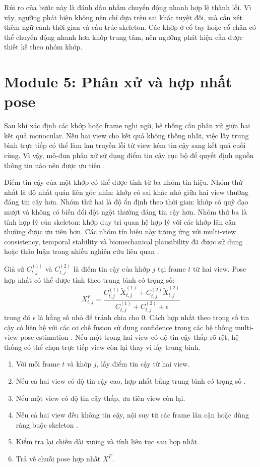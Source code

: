 \documentclass[../DoAn.tex]{subfiles}
\begin{document}
Rủi ro của bước này là đánh dấu nhầm chuyển động nhanh hợp lệ thành lỗi. Vì vậy, ngưỡng phát hiện không nên chỉ dựa trên sai khác tuyệt đối, mà cần xét thêm ngữ cảnh thời gian và cấu trúc skeleton. Các khớp ở cổ tay hoặc cổ chân có thể chuyển động nhanh hơn khớp trung tâm, nên ngưỡng phát hiện cần được thiết kế theo nhóm khớp.

\section{Module 5: Phân xử và hợp nhất pose}
\label{sec:judgment_fusion}

Sau khi xác định các khớp hoặc frame nghi ngờ, hệ thống cần phân xử giữa hai kết quả monocular. Nếu hai view cho kết quả không thống nhất, việc lấy trung bình trực tiếp có thể làm lan truyền lỗi từ view kém tin cậy sang kết quả cuối cùng. Vì vậy, mô-đun phân xử sử dụng điểm tin cậy cục bộ để quyết định nguồn thông tin nào nên được ưu tiên \cite{vu2026multiperspective}.

Điểm tin cậy của một khớp có thể được tính từ ba nhóm tín hiệu. Nhóm thứ nhất là độ nhất quán liên góc nhìn: khớp có sai khác nhỏ giữa hai view thường đáng tin cậy hơn. Nhóm thứ hai là độ ổn định theo thời gian: khớp có quỹ đạo mượt và không có biến đổi đột ngột thường đáng tin cậy hơn. Nhóm thứ ba là tính hợp lý của skeleton: khớp duy trì quan hệ hợp lý với các khớp lân cận thường được ưu tiên hơn. Các nhóm tín hiệu này tương ứng với multi-view consistency, temporal stability và biomechanical plausibility đã được sử dụng hoặc thảo luận trong nhiều nghiên cứu liên quan \cite{canonpose2021,physcap2020,keller2023skin}.

Giả sử $C^{(1)}_{t,j}$ và $C^{(2)}_{t,j}$ là điểm tin cậy của khớp $j$ tại frame $t$ từ hai view. Pose hợp nhất có thể được tính theo trung bình có trọng số:
\[
X^{F}_{t,j}
=
\frac{
C^{(1)}_{t,j}\tilde{X}^{(1)}_{t,j}
+
C^{(2)}_{t,j}\tilde{X}^{(2)}_{t,j}
}{
C^{(1)}_{t,j}+C^{(2)}_{t,j}+\epsilon
}
\]
trong đó $\epsilon$ là hằng số nhỏ để tránh chia cho 0. Cách hợp nhất theo trọng số tin cậy có liên hệ với các cơ chế fusion sử dụng confidence trong các hệ thống multi-view pose estimation \cite{mtftransformer2023}. Nếu một trong hai view có độ tin cậy thấp rõ rệt, hệ thống có thể chọn trực tiếp view còn lại thay vì lấy trung bình.

\begin{enumerate}[leftmargin=*, label=\arabic*.]
    \item Với mỗi frame $t$ và khớp $j$, lấy điểm tin cậy từ hai view.
    \item Nếu cả hai view có độ tin cậy cao, hợp nhất bằng trung bình có trọng số \cite{mtftransformer2023}.
    \item Nếu một view có độ tin cậy thấp, ưu tiên view còn lại.
    \item Nếu cả hai view đều không tin cậy, nội suy từ các frame lân cận hoặc dùng ràng buộc skeleton \cite{keller2023skin}.
    \item Kiểm tra lại chiều dài xương và tính liên tục sau hợp nhất.
    \item Trả về chuỗi pose hợp nhất $X^F$.
\end{enumerate}
\end{document}
